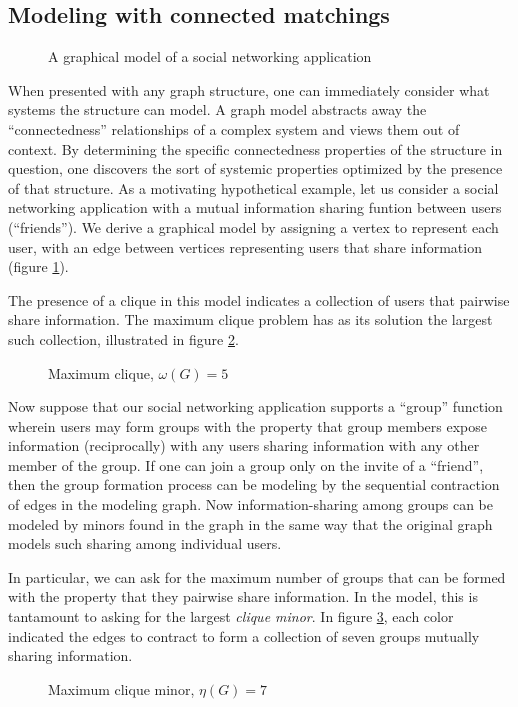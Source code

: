 \subsection{Modeling with connected matchings}
\begin{figure}[h]
\begin{center}\end{center}
\caption{A graphical model of a social networking application}
\label{soc_net}
\end{figure}
When presented with any graph structure, one can immediately consider what systems the structure can model.  A graph model abstracts away the ``connectedness'' relationships of a complex system and views them out of context.  By determining the specific connectedness properties of the structure in question, one discovers the sort of systemic properties optimized by the presence of that structure. As a motivating hypothetical example, let us consider a social networking application with a mutual information sharing funtion between users (``friends'').  We derive a graphical model by assigning a vertex to represent each user, with an edge between vertices representing users that share information (figure \ref{soc_net}).

The presence of a clique in this model indicates a collection of users that pairwise share information.  The maximum clique problem has as its solution the largest such collection, illustrated in figure \ref{soc_net_clique}.
\begin{figure}[h]
\begin{center}\end{center}
\caption{Maximum clique, $\omega(G) = 5$}
\label{soc_net_clique}
\end{figure}  

Now suppose that our social networking application supports a ``group'' function wherein users may form groups with the property that group members expose information (reciprocally) with any users sharing information with any other member of the group.  If one can join a group only on the invite of a ``friend'', then the group formation process can be modeling by the sequential contraction of edges in the modeling graph.  Now information-sharing among groups can be modeled by minors found in the graph in the same way that the original graph models such sharing among individual users.

In particular, we can ask for the maximum number of groups that can be formed with the property that they pairwise share information.  In the model, this is tantamount to asking for the largest \textit{clique minor}.  In figure \ref{soc_net_minor}, each color indicated the edges to contract to form a collection of seven groups mutually sharing information.
\begin{figure}[h]
\begin{center}\end{center}
\caption{Maximum clique minor, $\eta(G) = 7$}
\label{soc_net_minor}
\end{figure} 

